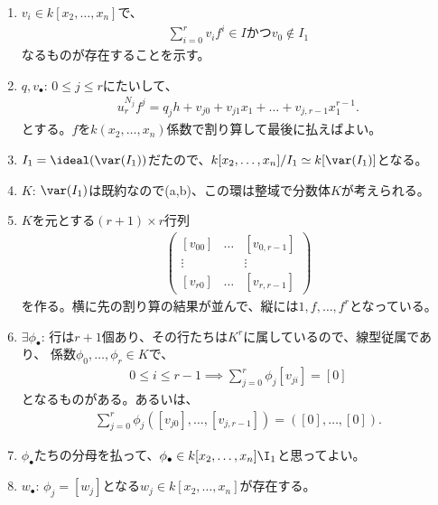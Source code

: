 \begin{enumerate}
\begin{enumerate}
\begin{enumerate}
\begin{enumerate}
        \item
        \begin{framed}
          $v_i \in k[x_2,\dots,x_n]$で、
          \begin{align}
            \sum_{i=0}^r v_i f^i \in I かつ
            v_0 \notin I_1
          \end{align}
          なるものが存在することを示す。
        \end{framed}
        \item
        $q,v_\bullet$:
        $0\le j \le r$にたいして、
        \begin{align}
          u_r^{N_j} f^j = q_j h+ v_{j0}+ v_{j1}x_1 + \dots + v_{j,r-1}x_1^{r-1}.
        \end{align}
        とする。$f$を$k(x_2,\dots,x_n)$係数で割り算して最後に払えばよい。
        \item
        $I_1 = \ideal(\var(I_1))$だたので、$k[x_2,\dots,x_n]/I_1 \simeq k[\var(I_1)]$となる。
        \item $K$:
        $\var(I_1)$は既約なので(a,b)、この環は整域で分数体$K$が考えられる。
        \item
        $K$を元とする$(r+1)\times r$行列
        \begin{align}
          \begin{pmatrix}
            [v_{00}] & \ldots & [v_{0,r-1}]\\
            \vdots & & \vdots \\
            [v_{r0}] & \ldots & [v_{r,r-1}]
          \end{pmatrix}
        \end{align}
        を作る。横に先の割り算の結果が並んで、縦には$1,f,\dots,f^r$となっている。
        \item $\exists \phi_\bullet$:
        行は$r+1$個あり、その行たちは$K^r$に属しているので、線型従属であり、
        係数$\phi_0,\dots,\phi_r \in K$で、
        \begin{align}
          0\le i \le r-1 \implies \sum_{j=0}^r \phi_j [v_{ji}] = [0]
        \end{align}
        となるものがある。あるいは、
        \begin{align}
          \sum_{j=0}^r \phi_j ([v_{j0}] ,\dots, [v_{j,r-1}]) = ([0],\dots,[0]).
        \end{align}
        \item
        $\phi_\bullet$たちの分母を払って、$\phi_\bullet \in k[x_2,\dots,x_n] \I_1$と思ってよい。
        \item
        $w_\bullet$: $\phi_j = [w_j]$となる$w_j \in k[x_2,\dots,x_n]$が存在する。

\end{enumerate}
\end{enumerate}
\end{enumerate}
\end{enumerate}
